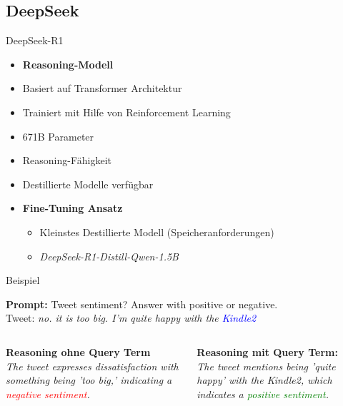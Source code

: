 \documentclass[aspectratio=169]{beamer} %
\begin{document}
\subsection{DeepSeek}

\begin{frame}{DeepSeek-R1}
\begin{itemize}
\item \textbf{Reasoning-Modell}
\item Basiert auf Transformer Architektur
\item Trainiert mit Hilfe von Reinforcement Learning
\item 671B Parameter
\item Reasoning-Fähigkeit
\item Destillierte Modelle verfügbar
\item \textbf{Fine-Tuning Ansatz}
\begin{itemize}
    \item Kleinstes Destillierte Modell (Speicheranforderungen)
    \item \textit{DeepSeek-R1-Distill-Qwen-1.5B}
\end{itemize}
\end{itemize}
\end{frame}

\begin{frame}{Beispiel}
\begin{center}
    \textbf{Prompt:} Tweet sentiment? Answer with positive or negative.\\
    Tweet: \glqq \textit{no. it is too big. I'm quite happy with the \textcolor{blue}{Kindle2}\grqq}
    \vspace{0.45cm}
    \begin{columns}
        \begin{column}{0.45\textwidth}
            \textbf{Reasoning ohne Query Term} \\
            \vspace{0.4cm}
            \glqq \textit{The tweet expresses dissatisfaction with something being 'too big,' indicating a \textcolor{red}{negative sentiment}.\grqq}
        \end{column}
        \begin{column}{0.45\textwidth}
            \textbf{Reasoning mit Query Term:} \\
            \vspace{0.4cm}
            \glqq \textit{The tweet mentions being 'quite happy' with the Kindle2, which indicates a \textcolor{green}{positive sentiment}.\grqq}
        \end{column}
    \end{columns}
\end{center}
    
\end{frame}
\end{document}
